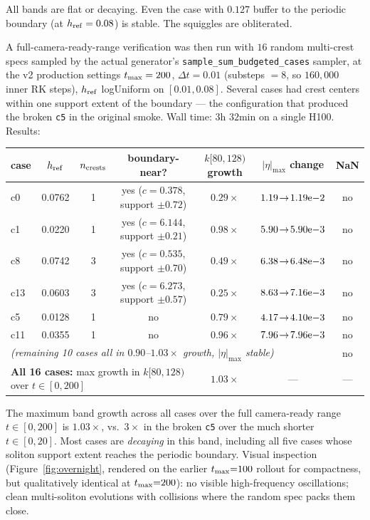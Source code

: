 \documentclass[11pt]{article}
\begin{document}
All bands are flat or decaying. Even the case with $0.127$ buffer to the
periodic boundary (at $h_{\rm ref} = 0.08$) is stable. The squiggles are
obliterated.

A full-camera-ready-range verification was then run with $16$ random
multi-crest specs sampled by the actual generator's
\verb|sample_sum_budgeted_cases| sampler, at the v2 production settings
$t_{\rm max} = 200$, $\Delta t = 0.01$ (substeps $= 8$, so $160{,}000$ inner
RK steps), $h_{\rm ref}$ logUniform on $[0.01, 0.08]$. Several cases had
crest centers within one support extent of the boundary --- the configuration
that produced the broken \texttt{c5} in the original smoke. Wall time:
$3$h $32$min on a single H100. Results:

\begin{center}
\small
\begin{tabular}{l c c c c c c}
\toprule
case & $h_{\rm ref}$ & $n_{\rm crests}$ & boundary-near? & $k[80,128)$ growth & $|\eta|_{\max}$ change & NaN \\
\midrule
c0  & 0.0762 & 1 & yes ($c{=}0.378$, support $\pm 0.72$) & $0.29\times$ & $1.19\!\to\!1.19{\rm e}{-2}$ & no \\
c1  & 0.0220 & 1 & yes ($c{=}6.144$, support $\pm 0.21$) & $0.98\times$ & $5.90\!\to\!5.90{\rm e}{-3}$ & no \\
c8  & 0.0742 & 3 & yes ($c{=}0.535$, support $\pm 0.70$) & $0.49\times$ & $6.38\!\to\!6.48{\rm e}{-3}$ & no \\
c13 & 0.0603 & 3 & yes ($c{=}6.273$, support $\pm 0.57$) & $0.25\times$ & $8.63\!\to\!7.16{\rm e}{-3}$ & no \\
c5  & 0.0128 & 1 & no                              & $0.79\times$ & $4.17\!\to\!4.10{\rm e}{-3}$ & no \\
c11 & 0.0355 & 1 & no                              & $0.96\times$ & $7.96\!\to\!7.96{\rm e}{-3}$ & no \\
\multicolumn{6}{l}{\textit{(remaining 10 cases all in $0.90$--$1.03\times$ growth, $|\eta|_{\max}$ stable)}} & no \\
\midrule
\multicolumn{4}{l}{\textbf{All 16 cases:} max growth in $k[80,128)$ over $t \in [0, 200]$} & $1.03\times$ & --- & --- \\
\bottomrule
\end{tabular}
\end{center}

The maximum band growth across all cases over the full camera-ready range
$t \in [0, 200]$ is $1.03\times$, vs.\ $3\times$ in the broken \texttt{c5}
over the much shorter $t \in [0, 20]$. Most cases are \emph{decaying} in
this band, including all five cases whose soliton support extent reaches the
periodic boundary. Visual inspection (Figure~\ref{fig:overnight}, rendered
on the earlier $t_{\rm max}{=}100$ rollout for compactness, but qualitatively
identical at $t_{\rm max}{=}200$): no visible high-frequency oscillations;
clean multi-soliton evolutions with collisions where the random spec packs
them close.
\end{document}
